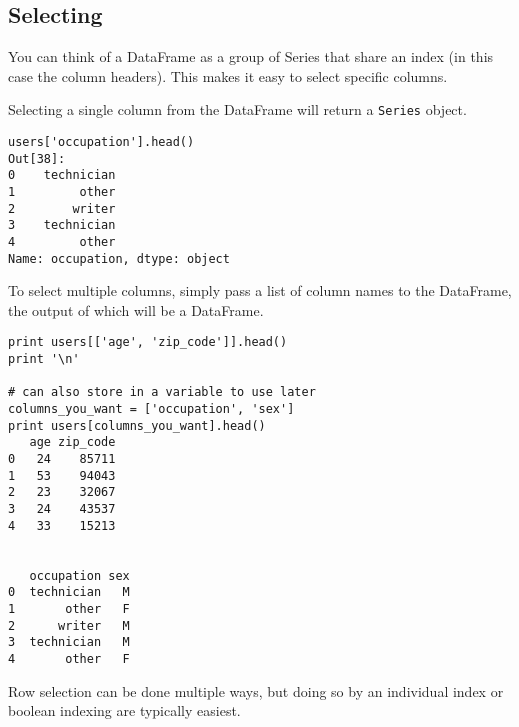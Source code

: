 \documentclass[]{article}
\begin{document}
\subsection{Selecting}

You can think of a DataFrame as a group of Series that share an index (in this case the column headers). This makes it easy to select specific columns.

Selecting a single column from the DataFrame will return a \texttt{Series} object.

\begin{framed}
\begin{verbatim}
users['occupation'].head()
Out[38]:
0    technician
1         other
2        writer
3    technician
4         other
Name: occupation, dtype: object
\end{verbatim}
\end{framed}

To select multiple columns, simply pass a list of column names to the DataFrame, the output of which will be a DataFrame.


\begin{framed}
\begin{verbatim}
print users[['age', 'zip_code']].head()
print '\n'

# can also store in a variable to use later
columns_you_want = ['occupation', 'sex'] 
print users[columns_you_want].head()
   age zip_code
0   24    85711
1   53    94043
2   23    32067
3   24    43537
4   33    15213


   occupation sex
0  technician   M
1       other   F
2      writer   M
3  technician   M
4       other   F
\end{verbatim}
\end{framed}

Row selection can be done multiple ways, but doing so by an individual index or boolean indexing are typically easiest.
\end{document}
